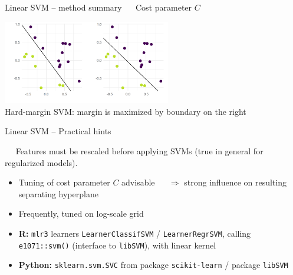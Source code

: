\begin{vbframe}{Linear SVM -- method summary}
 ~~ Cost parameter \textbf{$C$}

\hfill

\includegraphics[width=0.55\textwidth]{
  figure/linear_classif_1.png}  \\
  \tiny{Hard-margin SVM: margin is maximized by boundary on the right}
  \normalsize

\end{vbframe}



\begin{frame}{Linear SVM -- Practical hints}

\footnotesize

 ~~
Features must be rescaled before applying SVMs (true in general for regularized 
models).

\medskip


\begin{itemize}
  \item Tuning of cost parameter $C$ advisable ~~ $\Rightarrow$ strong influence 
  on resulting separating hyperplane
  \item Frequently, tuned on log-scale grid
\end{itemize}

\medskip

\begin{itemize}
  \item \textbf{R:} \texttt{mlr3} learners \texttt{LearnerClassifSVM} /
  \texttt{LearnerRegrSVM}, calling \texttt{e1071::svm()} (interface to 
  \texttt{libSVM}), with linear kernel
  \item \textbf{Python:} \texttt{sklearn.svm.SVC} from package 
  \texttt{scikit-learn} / package \texttt{libSVM}
\end{itemize}

\end{frame}


